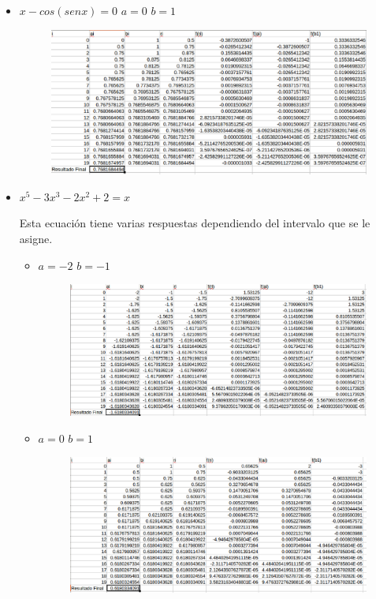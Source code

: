 \documentclass[a4paper,12pt]{article}
\begin{document}
\begin{itemize}
     
     \item $x-cos(senx) = 0$ $a = 0$ $b = 1$
      
      \begin{figure}[h]
      \centering
      \includegraphics[scale = 0.4]{22.eps}
     \end{figure}
     
     \item $x^5 - 3x^3 - 2x^2 + 2 = x$
     
     Esta ecuación tiene varias respuestas dependiendo del intervalo que se le asigne.
     
     
      \begin{itemize}
           
       \item $a = -2$ $b = -1$
      
      \begin{figure}[h]
      \centering
      \includegraphics[scale = 0.4]{231.eps}
     \end{figure}
      
      \newpage
       
       \item $a = 0$ $ b = 1$
       
       
       
      \begin{figure}[h]
      \centering
      \includegraphics[scale = 0.4]{232.eps}
     \end{figure} 
       

\end{itemize}
\end{itemize}
\end{document}
